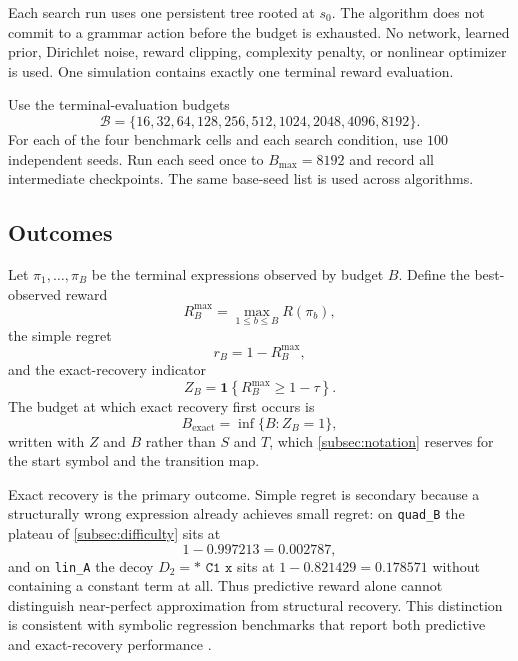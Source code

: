 \documentclass[11pt, a4paper]{article}
\theoremstyle{definition}
\begin{document}
Each search run uses one persistent tree rooted at \(s_0\).  The algorithm
does not commit to a grammar action before the budget is exhausted.  No
network, learned prior, Dirichlet noise, reward clipping, complexity penalty,
or nonlinear optimizer is used.  One simulation contains exactly one
terminal reward evaluation.

Use the terminal-evaluation budgets
\begin{equation}
    \mathcal B
    =
    \{
        16,32,64,128,256,512,
        1024,2048,4096,8192
    \}.
    \label{eq:budget-grid}
\end{equation}
For each of the four benchmark cells and each search condition, use \(100\)
independent seeds.  Run each seed once to \(B_{\max}=8192\) and record all
intermediate checkpoints.  The same base-seed list is used across algorithms.

\subsection{Outcomes}

Let \(\pi_1,\ldots,\pi_B\) be the terminal expressions observed by budget
\(B\).  Define the best-observed reward
\begin{equation}
    R_B^{\max}
    =
    \max_{1\leq b\leq B}R(\pi_b),
    \label{eq:best-observed-reward}
\end{equation}
the simple regret
\begin{equation}
    r_B
    =
    1-R_B^{\max},
    \label{eq:simple-regret}
\end{equation}
and the exact-recovery indicator
\begin{equation}
    Z_B
    =
    \mathbf 1
    \left\{
        R_B^{\max}\geq1-\tau
    \right\}.
    \label{eq:exact-recovery-indicator}
\end{equation}
The budget at which exact recovery first occurs is
\begin{equation}
    B_{\mathrm{exact}}
    =
    \inf\{B:Z_B=1\},
    \label{eq:time-to-recovery}
\end{equation}
written with \(Z\) and \(B\) rather than \(S\) and \(T\), which
\cref{subsec:notation} reserves for the start symbol and the transition map.

Exact recovery is the primary outcome.  Simple regret is secondary because a
structurally wrong expression already achieves small regret: on
\texttt{quad\_B} the plateau of \cref{subsec:difficulty} sits at
\[
    1-0.997213=0.002787,
\]
and on \texttt{lin\_A} the decoy \(D_2=\texttt{* C1 x}\) sits at
\(1-0.821429=0.178571\) without containing a constant term at all.
Thus predictive reward alone cannot distinguish near-perfect approximation
from structural recovery.  This distinction is consistent with symbolic
regression benchmarks that report both predictive and exact-recovery
performance \cite{lacava2021contemporary}.
\end{document}
